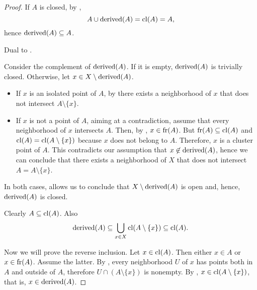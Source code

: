 \begin{proof}
  If \( A \) is closed, by ,
  \begin{equation*}
    A \cup \operatorname{derived}(A) = \operatorname{cl}(A) = A,
  \end{equation*}
  hence \( \operatorname{derived}(A) \subseteq A \).

   Dual to .

   Consider the complement of \( \operatorname{derived}(A) \). If it is empty, \( \operatorname{derived}(A) \) is trivially closed. Otherwise, let \( x \in X \setminus \operatorname{derived}(A) \).

  \begin{itemize}
    \item If \( x \) is an isolated point of \( A \), by  there exists a neighborhood of \( x \) that does not intersect \( A \setminus \{ x \} \).
    \item If \( x \) is not a point of \( A \), aiming at a contradiction, assume that every neighborhood of \( x \) intersects \( A \). Then, by , \( x \in \operatorname{fr}(A) \). But \( \operatorname{fr}(A) \subseteq \operatorname{cl}(A) \) and \( \operatorname{cl}(A) = \operatorname{cl}(A \setminus \{ x \}) \) because \( x \) does not belong to \( A \). Therefore, \( x \) is a cluster point of \( A \). This contradicts our assumption that \( x \not\in \operatorname{derived}(A) \), hence we can conclude that there exists a neighborhood of \( X \) that does not intersect \( A = A \setminus \{ x \} \).
  \end{itemize}

  In both cases,  allows us to conclude that \( X \setminus \operatorname{derived}(A) \) is open and, hence, \( \operatorname{derived}(A) \) is closed.

   Clearly \( A \subseteq \operatorname{cl}(A) \). Also
  \begin{equation*}
    \operatorname{derived}(A) \subseteq \bigcup_{x \in X} \operatorname{cl}(A \setminus \{ x \}) \subseteq \operatorname{cl}(A).
  \end{equation*}

  Now we will prove the reverse inclusion. Let \( x \in \operatorname{cl}(A) \). Then either \( x \in A \) or \( x \in \operatorname{fr}(A) \). Assume the latter. By , every neighborhood \( U \) of \( x \) has points both in \( A \) and outside of \( A \), therefore \( U \cap (A \setminus \{ x \}) \) is nonempty. By , \( x \in \operatorname{cl}(A \setminus \{ x \}) \), that is, \( x \in \operatorname{derived}(A) \).


\end{proof}
